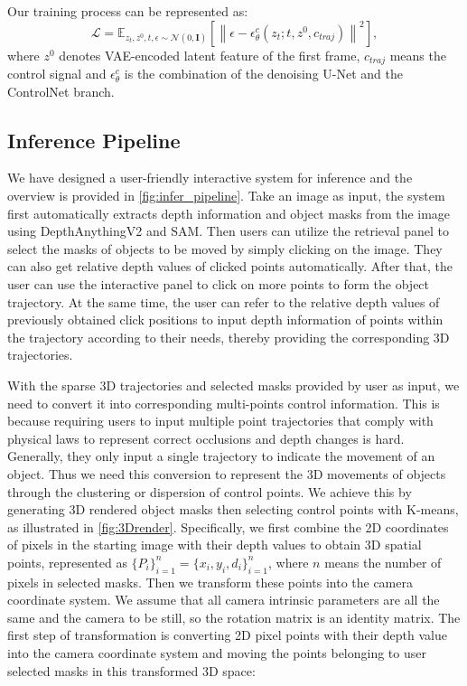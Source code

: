 Our training process can be represented as:
\vspace{-5pt}
\begin{equation}
\mathcal{L}=\mathbb{E}_{z_t, z^0, t, \epsilon \sim \mathcal{N}(0, \mathbf{I})}\left[\left\|\epsilon-\epsilon^{c}_{\theta}\left(z_t; t, z^0, c_{traj}\right)\right\|^2\right],
\label{eq:conditonal_denoising}
\end{equation}
where $z^0$ denotes VAE-encoded latent feature of the first frame, $c_{traj}$ means the control signal and $\epsilon^{c}_{\theta}$ is the combination of the denoising U-Net and the ControlNet branch.

\subsection{Inference Pipeline}
\label{method:inference}



We have designed a user-friendly interactive system for inference and the overview is provided in \cref{fig:infer_pipeline}. Take an image as input, the system first automatically extracts depth information and object masks from the image using DepthAnythingV2 and SAM. Then users can utilize the retrieval panel to select the masks of objects to be moved by simply clicking on the image. They can also get relative depth values of clicked points automatically. After that, the user can use the interactive panel to click on more points to form the object trajectory. At the same time, the user can refer to the relative depth values of previously obtained click positions to input depth information of points within the trajectory according to their needs, thereby providing the corresponding 3D trajectories. 

With the sparse 3D trajectories and selected masks provided by user as input, we need to convert it into corresponding multi-points control information. This is because requiring users to input multiple point trajectories that comply with physical laws to represent correct occlusions and depth changes is hard. Generally, they only input a single trajectory to indicate the movement of an object. Thus we need this conversion to represent the 3D movements of objects through the clustering or dispersion of control points.  We achieve this by generating 3D rendered object masks then selecting control points with K-means, as illustrated in \cref{fig:3Drender}. Specifically, we first combine the 2D coordinates of pixels in the starting image with their depth values to obtain 3D spatial points, represented as $\{P_i\}_{i=1}^n = \{x_i, y_i, d_i\}_{i=1}^n$, where $n$ means the number of pixels in selected masks. Then we transform these points into the camera coordinate system. We assume that all camera intrinsic parameters are all the same and the camera to be still, so the rotation matrix is an identity matrix. The first step of transformation is converting 2D pixel points with their depth value into the camera coordinate system and moving the points belonging to user selected masks in this transformed 3D space:

